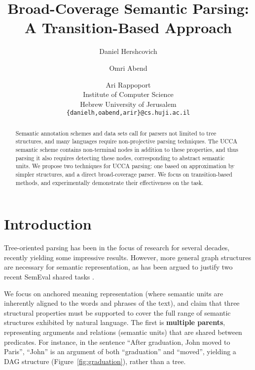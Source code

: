 \documentclass[11pt]{article}
\title{Broad-Coverage Semantic Parsing: A Transition-Based Approach}
\author{Daniel Hershcovich \and Omri Abend \and Ari Rappoport \\
  Institute of Computer Science \\
  Hebrew University of Jerusalem \\
  {\tt \{danielh,oabend,arir\}@cs.huji.ac.il}
}
\date{}
\newcommand{\secref}[1]{Section~\ref{#1}}
\newcommand{\figref}[1]{Figure~\ref{#1}}
\begin{document}
\maketitle

\begin{abstract}

Semantic annotation schemes and data sets call for parsers not limited to tree structures,
and many languages require non-projective parsing techniques.
The UCCA semantic scheme contains non-terminal nodes in addition to these properties,
and thus parsing it also requires detecting these nodes, corresponding to abstract semantic units.
We propose two techniques for UCCA parsing: one based on approximation by simpler structures,
and a direct broad-coverage parser. We focus on transition-based methods, and experimentally
demonstrate their effectiveness on the task.
  
\end{abstract}



\section{Introduction}

Tree-oriented parsing has been in the focus of research for several decades,
recently yielding some impressive results.
However, more general graph structures are necessary for semantic representation,
as has been argued to justify two recent SemEval shared tasks
\cite[see \secref{sec:related_work}]{oepen2014semeval,oepen2015semeval}.

We focus on anchored meaning representation
(where semantic units are inherently aligned to the words and phrases of the text),
and claim that three structural properties must be supported to cover the full range of semantic
structures exhibited by natural language.
The first is \textbf{multiple parents},
representing arguments and relations (semantic units) that are shared between predicates.
For instance, in the sentence
``After graduation, John moved to Paris'', ``John'' is an argument of both ``graduation''
and ``moved'', yielding a DAG structure (\figref{fig:graduation}), rather than a tree.
\end{document}
